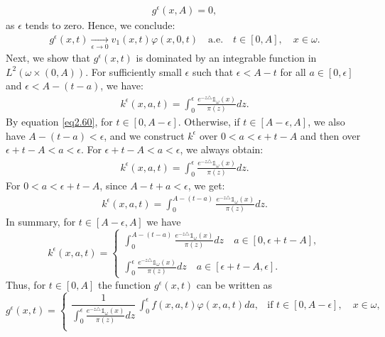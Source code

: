 \documentclass[10pt, a4]{amsart}
\makeatletter
\theoremstyle{plain}
\theoremstyle{definition}
\theoremstyle{remark}
\renewenvironment{proof}[1][\proofname]{\par
  \pushQED{\qed}%
  \normalfont \topsep6\p@\@plus6\p@\relax
  \trivlist
  \item[\hskip\labelsep
        \itshape
    #1\ \ref{#1}.]\ignorespaces
}{%
  \popQED\endtrivlist\@endpefalse
}
\numberwithin{equation}{section}
\def\to{\rightarrow}
\makeatother
\begin{document}
\begin{proof}[of Theorem \ref{th1.4}]
\begin{align*}
g^{\epsilon}(x,A)=0,
\end{align*} 
as \( \epsilon \) tends to zero.
Hence, we conclude:
\begin{align}
g^{\epsilon}(x,t) \xrightarrow[\epsilon\to 0]{} v_1(x,t)\varphi(x,0,t) \quad\text{a.e.} \quad t\in [0,A], \quad x\in \omega.
\end{align}
Next, we show that \( g^{\epsilon}(x,t) \) is dominated by an integrable function in \( L^2(\omega\times(0,A)) \). For sufficiently small \( \epsilon \) such that \( \epsilon < A - t \) for all \( a \in [0, \epsilon] \) and \( \epsilon < A - (t-a) \), we have:
\begin{align*}
k^{\epsilon}(x,a,t)=\int_{0}^{\epsilon}\frac{e^{-z\triangle}\mathds{1}_{\omega}(x)}{\pi(z)}dz.
\end{align*}
By equation \eqref{eq2.60}, for \( t \in [0,A-\epsilon] \). Otherwise, if \( t \in [A-\epsilon,A] \), we also have \( A-(t-a) < \epsilon \), and we construct \( k^{\epsilon} \) over \( 0 < a < \epsilon+t-A \) and then over \( \epsilon+t-A < a < \epsilon \).
For \( \epsilon+t-A < a < \epsilon \), we always obtain:
\begin{align*}
k^{\epsilon}(x,a,t)=\int_{0}^{\epsilon}\frac{e^{-z\triangle}\mathds{1}_{\omega}(x)}{\pi(z)}dz.
\end{align*}
For \( 0<a<\epsilon+t-A \), since \( A-t+a<\epsilon \), we get:
\begin{align*}
k^{\epsilon}(x,a,t)=\int_{0}^{A-(t-a)}\frac{e^{-z\triangle}\mathds{1}_{\omega}(x)}{\pi(z)}dz.
\end{align*}
In summary, for \( t\in [A-\epsilon,A] \) we have
\begin{equation}
k^{\epsilon}(x,a,t)=\left\lbrace
\begin{array}{ll}
\displaystyle\int_{0}^{A-(t-a)}\frac{e^{-z\triangle}\mathds{1}_{\omega}(x)}{\pi(z)}dz\quad a\in [0,\epsilon+t-A],\\
\\\displaystyle\int_{0}^{\epsilon}\frac{e^{-z\triangle}\mathds{1}_{\omega}(x)}{\pi(z)}dz \quad a\in [\epsilon+t-A,\epsilon].
\end{array}
\right.
\end{equation}
Thus, for \( t\in [0,A] \) the function \( g^{\epsilon}(x,t) \) can be written as
\begin{equation}\label{eq2.63}
g^{\epsilon}(x,t)=
\begin{cases}
\dfrac{1}{\displaystyle\int_{0}^{\epsilon}\frac{e^{-z\triangle}\mathds{1}_{\omega}(x)}{\pi(z)}dz}\,\displaystyle\int_0^\epsilon f(x,a,t)\varphi(x,a,t)da, & \text{if } t\in [0,A-\epsilon],\quad x\in \omega, \\[2ex]

\end{cases}
\end{equation}
\end{proof}
\end{document}

